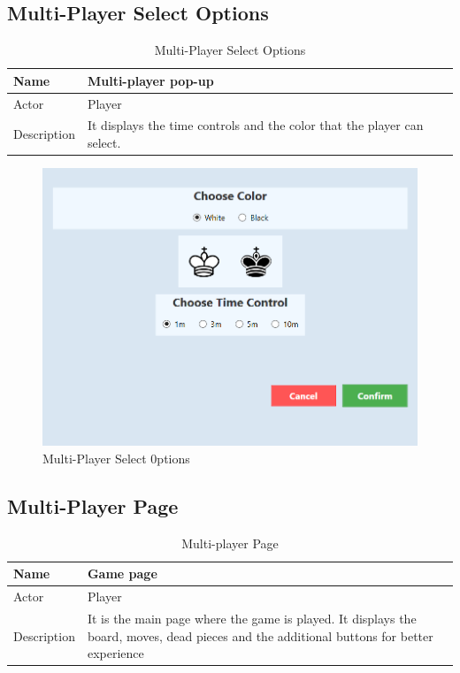 \documentclass[a4paper,12pt]{article}
\begin{document}
\subsection{Multi-Player Select Options}

\begin{longtable}{|m{}|m{}|}
    \caption{Multi-Player Select Options} \\
    \hline
    Name & Multi-player pop-up \\
    \hline
    Actor & Player \\
    \hline
    Description & It displays the time controls and the color that the player can select. \\ 
    \hline
\end{longtable}

\begin{figure}[H]
    \centering
    \includegraphics[width=0.7\linewidth]{Images/Use Cases/multiplayerSelectOptions.png}
    \caption{Multi-Player Select 0ptions}
    \label{fig:multiplayerSelectOptions}
\end{figure}

\subsection{Multi-Player Page}

\begin{longtable}{|m{}|m{}|}
    \caption{Multi-player Page} \\
    \hline
    Name & Game page \\
    \hline
    Actor & Player \\
    \hline
    Description & It is the main page where the game is played. It displays the board, moves, dead pieces and the additional buttons for better experience \\ 
    \hline
\end{longtable}
\end{document}
